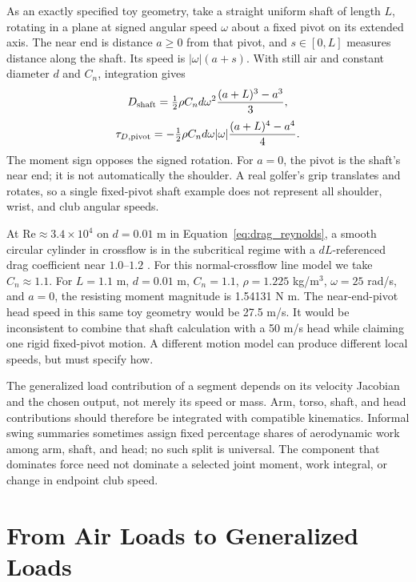 As an exactly specified toy geometry, take a straight uniform shaft of length
$L$, rotating in a plane at signed angular speed $\omega$ about a fixed pivot
on its extended axis. The near end is distance $a\geq0$ from that pivot, and
$s\in[0,L]$ measures distance along the shaft. Its speed is $|\omega|(a+s)$.
With still air and constant diameter $d$ and $C_n$, integration gives
\begin{equation}
 D_{\rm shaft}=\tfrac12\rho C_n d\omega^2
 \frac{(a+L)^3-a^3}{3},
 \label{eq:total-shaft-drag}
\end{equation}
\begin{equation}
 \tau_{D,\rm pivot}=-\tfrac12\rho C_n d\omega|\omega|
 \frac{(a+L)^4-a^4}{4}.
 \label{eq:shaft-drag-torque}
\end{equation}
The moment sign opposes the signed rotation. For $a=0$, the pivot is the shaft's
near end; it is not automatically the shoulder. A real golfer's grip translates
and rotates, so a single fixed-pivot shaft example does not represent all
shoulder, wrist, and club angular speeds.

At $\mathrm{Re}\approx3.4\times10^4$ on $d=0.01$ m in Equation~\ref{eq:drag_reynolds}, a smooth
circular cylinder in crossflow is in the subcritical regime with a
$dL$-referenced drag coefficient near $1.0$--$1.2$
\citep{schlichting2000boundary}. For this normal-crossflow line model we take
$C_n\approx1.1$. For $L=1.1$ m, $d=0.01$ m, $C_n=1.1$, $\rho=1.225$ kg/m$^3$,
$\omega=25$ rad/s, and $a=0$, the resisting moment magnitude is
1.54131 N m. The near-end-pivot head speed in this same toy geometry would be
27.5 m/s. It would be inconsistent to combine that shaft calculation with a
50 m/s head while claiming one rigid fixed-pivot motion. A different motion
model can produce different local speeds, but must specify how.

The generalized load contribution of a segment depends on its velocity
Jacobian and the chosen output, not merely its speed or mass. Arm, torso,
shaft, and head contributions should therefore be integrated with compatible
kinematics. Informal swing summaries sometimes assign fixed percentage shares of
aerodynamic work among arm, shaft, and head; no such split is universal. The component
that dominates force need not dominate a selected joint moment, work integral,
or change in endpoint club speed.

\section{From Air Loads to Generalized Loads}

